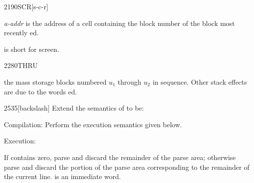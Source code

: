 \begin{newword}{2190}{SCR}[s-c-r]

	\emph{a-addr} is the address of a cell containing the block
	number of the block most recently ed.

	\begin{rationale} %
		 is short for screen.
	\end{rationale}
\end{newword}


\begin{newword}{2280}{THRU}

	 the mass storage blocks numbered $u_1$ through
	$u_2$ in sequence. Other stack effects are due to the words
	ed.
\end{newword}


\begin{newword}[bs]{2535}{\bs}[backslash]
	Extend the semantics of  to be:

\item[Compilation:]
	Perform the execution semantics given below.

\item[Execution:]

	If  contains zero, parse and discard the remainder
	of the parse area; otherwise parse and discard the portion
	of the parse area corresponding to the remainder of the current
	line.  is an immediate word.
\end{newword}
